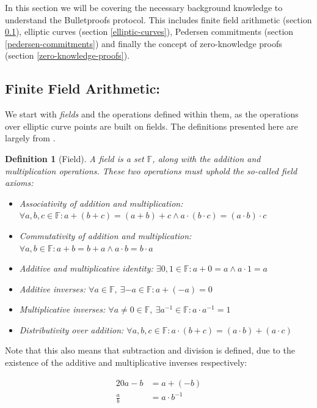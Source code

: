 \documentclass{article}
\newtheorem{definition}{Definition}[section]
\newcommand{\eq}[1]{\begin{alignat*}{20}#1\end{alignat*}}
\newcommand{\F}{\mathbb{F}}
\begin{document}
In this section we will be covering the necessary background
knowledge to understand the Bulletproofs protocol. This includes
finite field arithmetic (section \ref{finite-field-arithmetic}),
elliptic curves (section \ref{elliptic-curves}), Pedersen commitments
(section \ref{pedersen-commitments}) and finally the concept of
zero-knowledge proofs (section \ref{zero-knowledge-proofs}).

\subsection{Finite Field Arithmetic:} \label{finite-field-arithmetic}

We start with \textit{fields} and the operations defined within them,
as the operations over elliptic curve points are built on fields. The
definitions presented here are largely from \cite{elliptic-curves}.

\begin{definition}[Field]
	A field is a set $\F$, along with the \textit{addition} and
	\textit{multiplication} operations. These two operations must
	uphold the so-called \textit{field axioms}:

	\begin{itemize}
		\item Associativity of addition and multiplication:
		$\forall a,b,c \in \F : a + (b + c) = (a + b) + c \land a \cdot (b \cdot c) = (a \cdot b) \cdot c$
		\item Commutativity of addition and multiplication:
		$\forall a,b \in \F : a+b=b+a \land a \cdot b = b \cdot a$
		\item Additive and multiplicative identity:
		$\exists 0,1 \in \F : a + 0 = a \land a \cdot 1 = a$
		\item Additive inverses:
		$\forall a \in \F,\ \exists {-a} \in \F : a + ({-a}) = 0$
		\item Multiplicative inverses:
		$\forall a \neq 0 \in \F,\  \exists a^{-1} \in \F : a \cdot a^{-1} = 1$
		\item Distributivity over addition:
		$\forall a,b,c \in \F : a \cdot (b + c) = (a \cdot b) + (a \cdot c)$
	\end{itemize}
\end{definition}

Note that this also means that subtraction and division is defined,
due to the existence of the additive and multiplicative inverses
respectively:

\eq{
	a-b         &= a + (-b) \\
	\frac{a}{b} &= a \cdot b^{-1}
}
\end{document}
